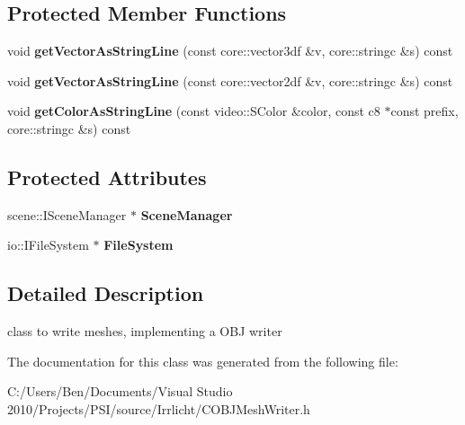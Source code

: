 \subsection*{Protected Member Functions}
\begin{DoxyCompactItemize}
\item 
\hypertarget{classirr_1_1scene_1_1_c_o_b_j_mesh_writer_a2d82f21b34b25b529b623c9e5ec1b59f}{void {\bfseries get\-Vector\-As\-String\-Line} (const core\-::vector3df \&v, core\-::stringc \&s) const }\label{classirr_1_1scene_1_1_c_o_b_j_mesh_writer_a2d82f21b34b25b529b623c9e5ec1b59f}

\item 
\hypertarget{classirr_1_1scene_1_1_c_o_b_j_mesh_writer_ace371f7add68d3931917303b3075abcc}{void {\bfseries get\-Vector\-As\-String\-Line} (const core\-::vector2df \&v, core\-::stringc \&s) const }\label{classirr_1_1scene_1_1_c_o_b_j_mesh_writer_ace371f7add68d3931917303b3075abcc}

\item 
\hypertarget{classirr_1_1scene_1_1_c_o_b_j_mesh_writer_a86c1f9a56a9226a78b7db10596dfeb1d}{void {\bfseries get\-Color\-As\-String\-Line} (const video\-::\-S\-Color \&color, const c8 $\ast$const prefix, core\-::stringc \&s) const }\label{classirr_1_1scene_1_1_c_o_b_j_mesh_writer_a86c1f9a56a9226a78b7db10596dfeb1d}

\end{DoxyCompactItemize}
\subsection*{Protected Attributes}
\begin{DoxyCompactItemize}
\item 
\hypertarget{classirr_1_1scene_1_1_c_o_b_j_mesh_writer_aa6c137b693176b171e147b8b5c5cb143}{scene\-::\-I\-Scene\-Manager $\ast$ {\bfseries Scene\-Manager}}\label{classirr_1_1scene_1_1_c_o_b_j_mesh_writer_aa6c137b693176b171e147b8b5c5cb143}

\item 
\hypertarget{classirr_1_1scene_1_1_c_o_b_j_mesh_writer_a2b265fe68cdf9cb3f6da3f3f4a49de18}{io\-::\-I\-File\-System $\ast$ {\bfseries File\-System}}\label{classirr_1_1scene_1_1_c_o_b_j_mesh_writer_a2b265fe68cdf9cb3f6da3f3f4a49de18}

\end{DoxyCompactItemize}


\subsection{Detailed Description}
class to write meshes, implementing a O\-B\-J writer 

The documentation for this class was generated from the following file\-:\begin{DoxyCompactItemize}
\item 
C\-:/\-Users/\-Ben/\-Documents/\-Visual Studio 2010/\-Projects/\-P\-S\-I/source/\-Irrlicht/C\-O\-B\-J\-Mesh\-Writer.\-h\end{DoxyCompactItemize}
